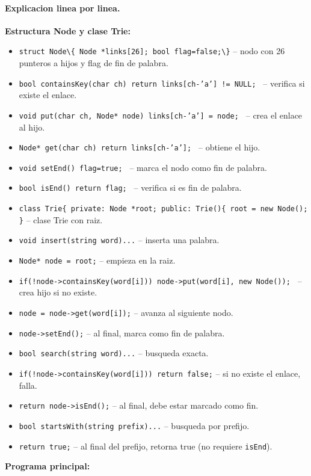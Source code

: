 \paragraph{Explicacion linea por linea.}
\textbf{Estructura Node y clase Trie:}
\begin{itemize}\setlength\itemsep{0pt}
	\item \verb|struct Node\{ Node *links[26]; bool flag=false;\}| -- nodo con 26 punteros a hijos y flag de fin de palabra.
	\item \texttt{bool containsKey(char ch){ return links[ch-'a'] != NULL; }} -- verifica si existe el enlace.
	\item \texttt{void put(char ch, Node* node){ links[ch-'a'] = node; }} -- crea el enlace al hijo.
	\item \texttt{Node* get(char ch){ return links[ch-'a']; }} -- obtiene el hijo.
	\item \texttt{void setEnd(){ flag=true; }} -- marca el nodo como fin de palabra.
	\item \texttt{bool isEnd(){ return flag; }} -- verifica si es fin de palabra.
	\item \verb|class Trie{ private: Node *root; public: Trie(){ root = new Node(); }| -- clase Trie con raiz.
	\item \texttt{void insert(string word){...}} -- inserta una palabra.
	\item \texttt{Node* node = root;} -- empieza en la raiz.
	\item \texttt{if(!node->containsKey(word[i])){ node->put(word[i], new Node()); }} -- crea hijo si no existe.
	\item \texttt{node = node->get(word[i]);} -- avanza al siguiente nodo.
	\item \texttt{node->setEnd();} -- al final, marca como fin de palabra.
	\item \texttt{bool search(string word){...}} -- busqueda exacta.
	\item \texttt{if(!node->containsKey(word[i])) return false;} -- si no existe el enlace, falla.
	\item \texttt{return node->isEnd();} -- al final, debe estar marcado como fin.
	\item \texttt{bool startsWith(string prefix){...}} -- busqueda por prefijo.
	\item \texttt{return true;} -- al final del prefijo, retorna true (no requiere \texttt{isEnd}).
\end{itemize}
\textbf{Programa principal:}
